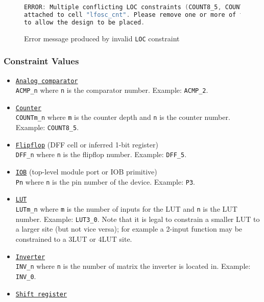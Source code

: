 \documentclass[11pt]{article}
\newcommand{\tokenstyle}[1]{\texttt{#1}}
\newcommand{\valuestyle}[1]{\texttt{#1}}
\newcommand{\strvaluestyle}[1]{\valuestyle{\textquotedbl#1\textquotedbl}}
\newcommand{\whenstyle}[1]{{\fontseries{sb}\selectfont#1}}
\newcommand{\tokenref}[2]{\hyperref[#2]{\tokenstyle{#1}}}
\begin{document}
\begin{figure}[h]
\begin{lstlisting}[language=c]
ERROR: Multiple conflicting LOC constraints (COUNT8_5, COUNT8_4) are
attached to cell "lfosc_cnt". Please remove one or more of the constraints
to allow the design to be placed.
\end{lstlisting}
\caption{Error message produced by invalid \tokenstyle{LOC} constraint}
\label{conflicting-loc}
\end{figure}

\pagebreak
\subsubsection{Constraint Values}
\begin{itemize}
\item \whenstyle{\tokenref{Analog comparator}{gp-acmp}}\\
\strvaluestyle{ACMP\_n} where \tokenstyle{n} is the comparator number. Example: \strvaluestyle{ACMP\_2}.
\item \whenstyle{\tokenref{Counter}{gp-count8}}\\
\strvaluestyle{COUNTm\_n} where \tokenstyle{m} is the counter depth and \tokenstyle{n} is the counter number.
Example: \strvaluestyle{COUNT8\_5}.
\item \whenstyle{\tokenref{Flipflop}{gp-dff} (DFF cell or inferred 1-bit register)}\\
\strvaluestyle{DFF\_n} where \tokenstyle{n} is the flipflop number. Example: \strvaluestyle{DFF\_5}.
\item \whenstyle{\tokenref{IOB}{gp-iobuf} (top-level module port or IOB primitive)}\\
\strvaluestyle{Pn} where \tokenstyle{n} is the pin number of the device. Example: \strvaluestyle{P3}.
\item \whenstyle{\tokenref{LUT}{gp-2lut}}\\
\strvaluestyle{LUTm\_n} where \tokenstyle{m} is the number of inputs for the LUT and \tokenstyle{n} is the LUT number.
Example: \strvaluestyle{LUT3\_0}. Note that it is legal to constrain a smaller LUT to a larger site (but not vice 
versa); for example a 2-input function may be constrained to a 3LUT or 4LUT site.
\item \whenstyle{\tokenref{Inverter}{gp-inv}}\\
\strvaluestyle{INV\_n} where \tokenstyle{n} is the number of matrix the inverter is located in. Example:
\strvaluestyle{INV\_0}.
\item \whenstyle{\tokenref{Shift register}{gp-shreg}}\\

\end{itemize}
\end{document}
